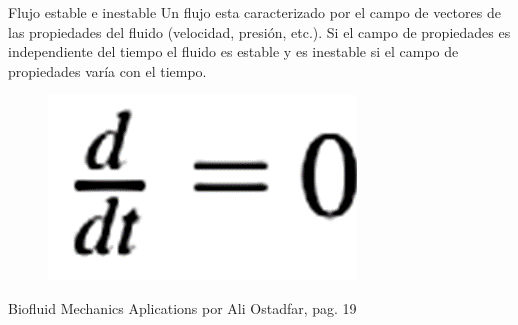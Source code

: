 \begin{frame}{Flujo estable e inestable}
\justifying
Un flujo esta caracterizado por el campo de vectores de las propiedades del fluido (velocidad, presión, etc.). Si el campo de propiedades es independiente del tiempo el fluido es estable y es inestable si el campo de propiedades varía con el tiempo.

\begin{figure}[H]
\centering
\includegraphics[scale=0.2]{Section_Files/S2-imagenes-Manuel/01.png}
\end{figure}


{\tiny Biofluid Mechanics Aplications por Ali Ostadfar, pag. 19}
\end{frame}

